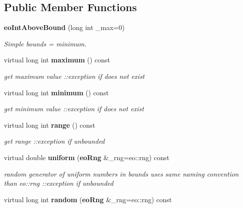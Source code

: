 \subsection*{Public Member Functions}
\begin{CompactItemize}
\item 
{\bf eo\-Int\-Above\-Bound} (long int \_\-max=0)\label{classeo_int_above_bound_a1}

\begin{CompactList}\small\item\em Simple bounds = minimum. \item\end{CompactList}\item 
virtual long int {\bf maximum} () const \label{classeo_int_above_bound_a2}

\begin{CompactList}\small\item\em get maximum value ::exception if does not exist \item\end{CompactList}\item 
virtual long int {\bf minimum} () const \label{classeo_int_above_bound_a3}

\begin{CompactList}\small\item\em get minimum value ::exception if does not exist \item\end{CompactList}\item 
virtual long int {\bf range} () const \label{classeo_int_above_bound_a4}

\begin{CompactList}\small\item\em get range ::exception if unbounded \item\end{CompactList}\item 
virtual double {\bf uniform} ({\bf eo\-Rng} \&\_\-rng=eo::rng) const \label{classeo_int_above_bound_a5}

\begin{CompactList}\small\item\em random generator of uniform numbers in bounds uses same naming convention than eo::rng ::exception if unbounded \item\end{CompactList}\item 
virtual long int {\bf random} ({\bf eo\-Rng} \&\_\-rng=eo::rng) const \label{classeo_int_above_bound_a6}


\end{CompactItemize}
